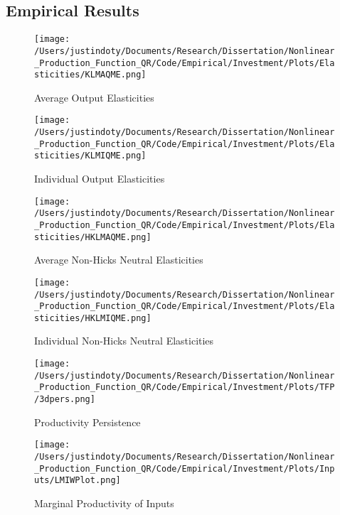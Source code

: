 \documentclass{article}
\begin{document}
\subsection{Empirical Results}

\begin{figure}[H]
\centering
\caption{Average Output Elasticities}
\texttt{[image: /Users/justindoty/Documents/Research/Dissertation/Nonlinear\_Production\_Function\_QR/Code/Empirical/Investment/Plots/Elasticities/KLMAQME.png]}
\label{klmaqme}
\end{figure} 

\begin{figure}[H]
\centering
\caption{Individual Output Elasticities}
\texttt{[image: /Users/justindoty/Documents/Research/Dissertation/Nonlinear\_Production\_Function\_QR/Code/Empirical/Investment/Plots/Elasticities/KLMIQME.png]}
\label{klmiqme}
\end{figure} 

\begin{figure}[H]
\centering
\caption{Average Non-Hicks Neutral Elasticities}
\texttt{[image: /Users/justindoty/Documents/Research/Dissertation/Nonlinear\_Production\_Function\_QR/Code/Empirical/Investment/Plots/Elasticities/HKLMAQME.png]}
\label{hklmaqme}
\end{figure} 

\begin{figure}[H]
\centering
\caption{Individual Non-Hicks Neutral Elasticities}
\texttt{[image: /Users/justindoty/Documents/Research/Dissertation/Nonlinear\_Production\_Function\_QR/Code/Empirical/Investment/Plots/Elasticities/HKLMIQME.png]}
\label{hklmiqme}
\end{figure}

\begin{figure}[H]
\centering
\caption{Productivity Persistence}
\texttt{[image: /Users/justindoty/Documents/Research/Dissertation/Nonlinear\_Production\_Function\_QR/Code/Empirical/Investment/Plots/TFP/3dpers.png]}
\label{pers}
\end{figure}

\begin{figure}[H]
\centering
\caption{Marginal Productivity of Inputs}
\texttt{[image: /Users/justindoty/Documents/Research/Dissertation/Nonlinear\_Production\_Function\_QR/Code/Empirical/Investment/Plots/Inputs/LMIWPlot.png]}
\label{lmiw}
\end{figure}
\end{document}
